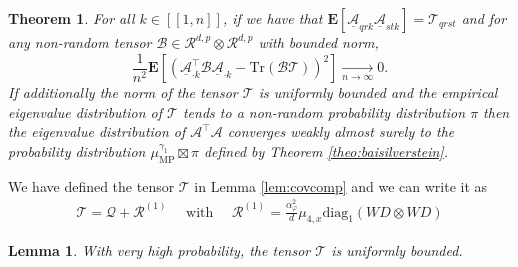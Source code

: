 \documentclass[letterpaper, 10pt, dvipsnames]{article}
\numberwithin{equation}{section}
\newcommand{\A}{\mathcal{A}}
\newcommand{\Au}{\underline{\mathcal{A}}}
\newcommand{\B}{\mathcal{B}}
\newcommand{\Q}{\mathcal{Q}}
\newcommand{\R}{\mathcal{R}}
\newcommand{\T}{\mathcal{T}}
\renewcommand{\phi}{\varphi}
\newcommand{\E}{\mathds{E}}
\newcommand{\Eb}{\mathbf{E}}
\newcommand{\unn}[2]{[\![#1,#2]\!]}
\newtheorem{thm}[ccounter]{Theorem}
\newtheorem{lem}[ccounter]{Lemma}
\theoremstyle{definition}
\begin{document}
\begin{thm}\label{thm:baizhou}
  For all $k\in\unn{1}{n}$, if we have that $\Eb\left[\underline{\A}_{qrk}\underline{\A}_{stk} \right]=\T_{qrst}$ and for any non-random tensor $\B\in \R^{d,p}\otimes \R^{d,p}$ with bounded norm,
  \[
    \frac{1}{n^2}\Eb\left[
      \left(
        \Au_{\cdot k}^\top \B\Au_{\cdot k} - \mathrm{Tr}(\B\T)
      \right)^2
    \right]  
    \xrightarrow[n\to\infty]{}0.
  \] If additionally the norm of the tensor $\T$ is uniformly bounded and the empirical eigenvalue distribution of $\T$ tends to a non-random probability distribution $\pi$ then the eigenvalue distribution of $\A^\top \A$ converges weakly almost surely to the probability distribution $\mu_{\mathrm{MP}}^{\gamma_1}\boxtimes \pi$ defined by Theorem \ref{theo:baisilverstein}.
\end{thm}
We have defined the tensor $\T$ in Lemma \ref{lem:covcomp} and we can write it as 
\[
\begin{gathered}
\T = \Q + \R^{(1)} 
\quad\text{ with }\quad
\R^{(1)} = \frac{\alpha_\phi^2}{d}\mu_{4,x}\mathrm{diag}_1\left(
  WD\otimes WD
  \right)
\end{gathered}
\]
\begin{lem}
  With very high probability, the tensor $\T$ is uniformly bounded.
\end{lem}
\end{document}
